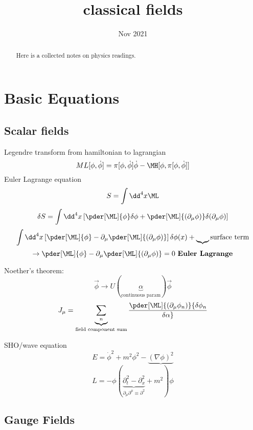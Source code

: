\documentclass[10pt]{scrartcl}
\begin{document}
	\title{classical fields} %
	\date{Nov 2021}
	\maketitle
	
	\begin{abstract}
		\sffamily\small
		Here is a collected notes on physics readings.
	\end{abstract}
	
	\vspace{1em}
	
	\tableofcontents
	\newpage
	
\section{Basic Equations}

\subsection{Scalar fields}
Legendre transform from hamiltonian to lagrangian
\[ ML[\phi, \dot{\phi}] = \pi[\phi, \dot{\phi}]  \dot{\phi} - \MH[\phi, \pi[\phi, \dot{\phi}]] \]
Euler Lagrange equation
\[S = \int \dd^4 x \ML\]
\[\delta S = \int \dd^4 x \left[\pder[\ML]{\phi} \delta \phi + \pder[\ML]{(\partial_\mu \phi)} \delta(\partial_\mu \phi) \right]\]
\[ \int \dd^4 x \left[\pder[\ML]{\phi} -   \partial_\mu \pder[\ML]{(\partial_\mu \phi)} \right] \delta \phi(x) + \underbrace{}{\text{surface term}} \]
\[\rightarrow \pder[\ML]{\phi} -   \partial_\mu \pder[\ML]{(\partial_\mu \phi)}  = 0 \text{ \textbf{Euler Lagrange}}\]

Noether's theorem:
\[ \vec{\phi} \rightarrow U(\underbrace{\alpha}_{\text{continuous param}}) \vec{\phi} \]
\[J_\mu = \underbrace{\sum_n}_{\text{field component sum}} \pder[\ML]{(\partial_\mu \phi_n)} {\delta \phi_n \over \delta \alpha} \]

SHO/wave equation
\[E = \dot{\phi}^2 + m^2 \phi^2 - \underbrace{(\nabla \phi)^2} \]
\[L = - \phi (\underbrace{\partial_t^2 - \partial_x^2}_{\partial_\mu \partial^\mu \equiv \partial^2}+ m^2) \phi \]

\subsection{Gauge Fields}
\end{document}
